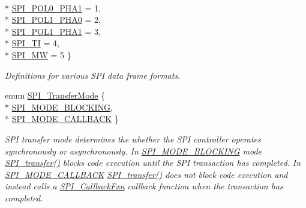 \begin{DoxyCompactItemize}
\\*
\hyperlink{_s_p_i_8h_a4e1f33555dfa8147205af5b266f3a489a340efc6d0f6f3b5be1151444c15faabf}{S\+P\+I\+\_\+\+P\+O\+L0\+\_\+\+P\+H\+A1} = 1, 
\\*
\hyperlink{_s_p_i_8h_a4e1f33555dfa8147205af5b266f3a489ace88daceb628498715aeda698541c95c}{S\+P\+I\+\_\+\+P\+O\+L1\+\_\+\+P\+H\+A0} = 2, 
\\*
\hyperlink{_s_p_i_8h_a4e1f33555dfa8147205af5b266f3a489a4441729b292511628cb1e9f102da9166}{S\+P\+I\+\_\+\+P\+O\+L1\+\_\+\+P\+H\+A1} = 3, 
\\*
\hyperlink{_s_p_i_8h_a4e1f33555dfa8147205af5b266f3a489ac3cb11b3a833e28368e267161551eb1d}{S\+P\+I\+\_\+\+T\+I} = 4, 
\\*
\hyperlink{_s_p_i_8h_a4e1f33555dfa8147205af5b266f3a489a34dc698e46fc5c1b2b1f0de19a44fdcb}{S\+P\+I\+\_\+\+M\+W} = 5
 \}
\begin{DoxyCompactList}\small\item\em Definitions for various S\+P\+I data frame formats. \end{DoxyCompactList}\item 
enum \hyperlink{_s_p_i_8h_ab9ea76c6529d6076eee5e1c4a5a92c6f}{S\+P\+I\+\_\+\+Transfer\+Mode} \{ \\*
\hyperlink{_s_p_i_8h_ab9ea76c6529d6076eee5e1c4a5a92c6fa0dfb2358e008316426895e7237c398e8}{S\+P\+I\+\_\+\+M\+O\+D\+E\+\_\+\+B\+L\+O\+C\+K\+I\+N\+G}, 
\\*
\hyperlink{_s_p_i_8h_ab9ea76c6529d6076eee5e1c4a5a92c6fa5631e69925c47a62a261c78ebbda39fb}{S\+P\+I\+\_\+\+M\+O\+D\+E\+\_\+\+C\+A\+L\+L\+B\+A\+C\+K}
 \}
\begin{DoxyCompactList}\small\item\em S\+P\+I transfer mode determines the whether the S\+P\+I controller operates synchronously or asynchronously. In \hyperlink{_s_p_i_8h_ab9ea76c6529d6076eee5e1c4a5a92c6fa0dfb2358e008316426895e7237c398e8}{S\+P\+I\+\_\+\+M\+O\+D\+E\+\_\+\+B\+L\+O\+C\+K\+I\+N\+G} mode \hyperlink{_s_p_i_8h_a989e17f96b54fcc3dc2cac5f8ac6bdb2}{S\+P\+I\+\_\+transfer()} blocks code execution until the S\+P\+I transaction has completed. In \hyperlink{_s_p_i_8h_ab9ea76c6529d6076eee5e1c4a5a92c6fa5631e69925c47a62a261c78ebbda39fb}{S\+P\+I\+\_\+\+M\+O\+D\+E\+\_\+\+C\+A\+L\+L\+B\+A\+C\+K} \hyperlink{_s_p_i_8h_a989e17f96b54fcc3dc2cac5f8ac6bdb2}{S\+P\+I\+\_\+transfer()} does not block code execution and instead calls a \hyperlink{_s_p_i_8h_a207e2d5a7e7ea5606b6995b6485ca015}{S\+P\+I\+\_\+\+Callback\+Fxn} callback function when the transaction has completed. \end{DoxyCompactList}\end{DoxyCompactItemize}
